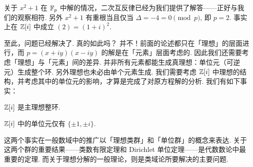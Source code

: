 关于 $x^2+1$ 在 $\mathbb F_p$ 中解的情况，二次互反律\footnotemark{}已经为我们提供了解答——正好与我们的观察相符.  另外 $x^2+1$ 有重根当且仅当 $\Delta = -4 = 0 \pmod p$, 即 $p = 2$.  事实上在 $\mathbb Z[i]$ 中成立 $(2) = (1+i)^2$.


至此，问题已经解决了.  {\kaishu 真的如此吗？}  并不！前面的论述都只在「理想」的层面进行，而 $p = (x+iy)(x-iy)$ 的解是在「元素」层面考虑的.  因此我们还需要考虑「理想」与「元素」间的差异.  并非所有元素都能生成真理想：单位元（可逆元）生成整个环.  另外理想也未必由单个元素生成.  我们需要考虑 $\mathbb Z[i]$ 中理想的结构，并考虑其中的单位元的影响，才算是完成了对原方程解的分析.  我们有如下事实：
\begin{fact}
  $\mathbb Z[i]$ 是主理想整环.
\end{fact}
\begin{fact}
  $\mathbb Z[i]$ 中的单位元仅有 $\{\pm 1, \pm i\}$.
\end{fact}

这两个事实在一般数域中的推广以「理想类群」和「单位群」的概念来表达.  关于这两个群的重要结果——类数有限定理和 Dirichlet 单位定理——是代数数论中最重要的定理.  而关于理想分解的一般理论，则是类域论所要解决的主要问题.

